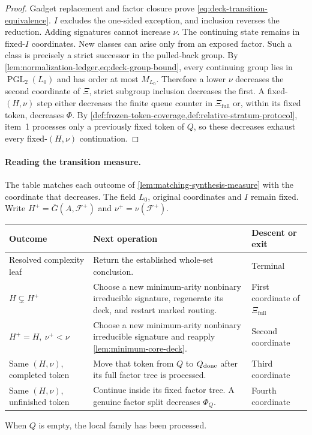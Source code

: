 \documentclass[11pt,letterpaper,onecolumn]{article}
\theoremstyle{plain}
\theoremstyle{definition}
\theoremstyle{remark}
\newcommand{\cF}{\mathcal F}
\newcommand{\PGL}{\operatorname{PGL}}
\begin{document}
\begin{proof}
Gadget replacement and factor closure prove
\cref{eq:deck-transition-equivalence}. \(I\) excludes the one-sided
exception, and inclusion reverses the reduction.  Adding signatures cannot increase \(\nu\).  The continuing state remains in fixed-\(I\)
coordinates.  New classes can arise only from an exposed factor. Such a
class is precisely a strict successor in the pulled-back group.  By
  \cref{lem:normalization-ledger,eq:deck-group-bound}, every continuing group
lies in \(\PGL_2(L_0)\) and has order at most \(M_{L_0}\).  Therefore a lower
  \(\nu\) decreases the second coordinate of \(\Xi\), strict subgroup
  inclusion decreases the first.  A fixed-\((H,\nu)\) step either decreases the
  finite queue counter in \(\Xi_{\mathrm{full}}\) or, within its fixed token, decreases
\(\Phi\). By \cref{def:frozen-token-coverage,def:relative-stratum-protocol},
item~1 processes only a previously fixed token of \(Q\), so these
decreases exhaust every fixed-\((H,\nu)\) continuation.
\end{proof}

\paragraph{Reading the transition measure.}
The table matches each outcome of \cref{lem:matching-synthesis-measure}
with the coordinate that decreases. The field \(L_0\), original
coordinates and \(I\) remain fixed.  Write
\(H^+=\overline G(A,\cF^+)\) and \(\nu^+=\nu(\cF^+)\).
\begin{center}
\begin{tabularx}{\linewidth}{@{}L{.23\linewidth}>{\raggedright\arraybackslash}XL{.20\linewidth}@{}}
\toprule
Outcome & Next operation & Descent or exit\\
\midrule
Resolved complexity leaf & Return the established whole-set conclusion. & Terminal\\[3pt]
\(H\subsetneq H^+\) & Choose a new minimum-arity nonbinary irreducible signature, regenerate its deck,
and restart marked routing. & First coordinate of \(\Xi_{\mathrm{full}}\)\\[3pt]
\(H^+=H,\ \nu^+<\nu\) & Choose a new minimum-arity nonbinary irreducible signature and reapply
\cref{lem:minimum-core-deck}. & Second coordinate\\[3pt]
Same \((H,\nu)\), completed token & Move that token from \(Q\) to
\(Q_{\rm done}\) after its full factor tree is processed. & Third coordinate\\[3pt]
Same \((H,\nu)\), unfinished token & Continue inside its fixed factor
tree. A genuine factor split decreases \(\Phi_Q\). & Fourth coordinate\\
\bottomrule
\end{tabularx}
\end{center}
When \(Q\) is empty, the local family has been processed.
\end{document}
